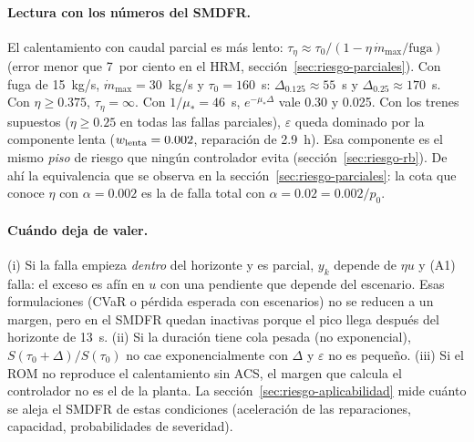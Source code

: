 \paragraph{Lectura con los números del SMDFR.} El calentamiento con caudal parcial es más lento:
$\tau_\eta\approx\tau_0/(1-\eta\,\dot m_{\max}/\text{fuga})$ (error menor que 7~por ciento en el HRM,
sección~\ref{sec:riesgo-parciales}). Con fuga de 15~kg/s, $\dot m_{\max}=30$~kg/s y $\tau_0=160$~s: $\Delta_{0.125}\approx55$~s y
$\Delta_{0.25}\approx170$~s. Con $\eta\ge0.375$, $\tau_\eta=\infty$. Con $1/\mu_\ast=46$~s,
$e^{-\mu_\ast\Delta}$ vale 0.30 y 0.025. Con los trenes supuestos ($\eta\ge0.25$ en todas las fallas
parciales), $\varepsilon$ queda dominado por la componente lenta ($w_{\rm lenta}=0.002$, reparación
de 2.9~h). Esa componente es el mismo \emph{piso} de riesgo que ningún controlador evita
(sección~\ref{sec:riesgo-rb}). De ahí la equivalencia que se observa en la
sección~\ref{sec:riesgo-parciales}: la cota que conoce $\eta$ con $\alpha=0.002$ es la de
falla total con $\alpha=0.02=0.002/p_0$.

\paragraph{Cuándo deja de valer.} (i) Si la falla empieza \emph{dentro} del horizonte y es
parcial, $y_k$ depende de $\eta u$ y (A1) falla: el exceso es afín en $u$ con una pendiente que
depende del escenario. Esas formulaciones (CVaR o pérdida esperada con escenarios) no se reducen
a un margen, pero en el SMDFR quedan inactivas porque el pico llega después del horizonte de
13~s. (ii) Si la duración tiene cola pesada (no exponencial), $S(\tau_0+\Delta)/S(\tau_0)$ no
cae exponencialmente con $\Delta$ y $\varepsilon$ no es pequeño. (iii) Si el ROM no reproduce el
calentamiento sin ACS, el margen que calcula el controlador no es el de la planta. La
sección~\ref{sec:riesgo-aplicabilidad} mide cuánto se aleja el SMDFR de estas condiciones
(aceleración de las reparaciones, capacidad, probabilidades de severidad).

